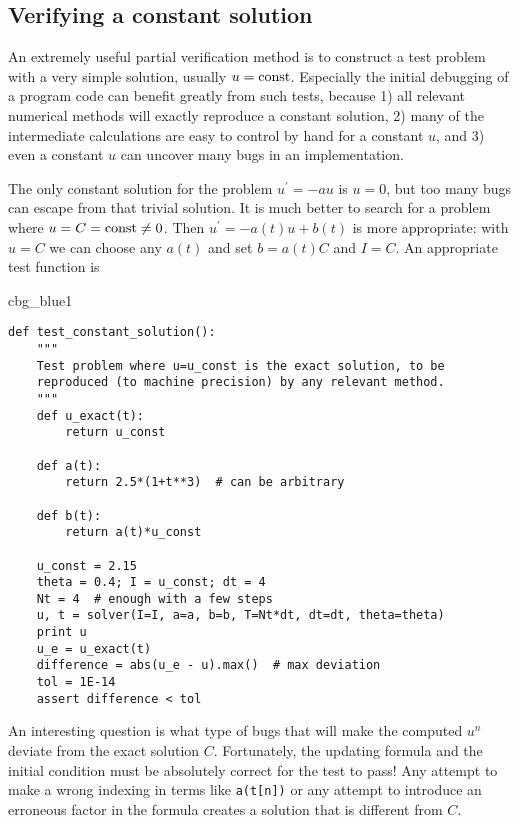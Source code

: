 \documentclass[graybox,sectrefs,envcountresetchap,open=right,final]{svmonodo}
\newenvironment{_cod_tight}[1]{
   \def\FrameCommand{\colorbox{#1}}
   \FrameRule0.6pt\MakeFramed {\FrameRestore}\vskip3mm}
   {\vskip0mm\endMakeFramed}
\newenvironment{cod}[1]{
\bgroup\rmfamily
\fboxsep=0mm\relax
\begin{_cod_tight}{#1}
\list{}{\parsep=-2mm\parskip=0mm\topsep=0pt\leftmargin=2mm
\rightmargin=2\leftmargin\leftmargin=4pt\relax}
\item\relax}
{\endlist\end{_cod_tight}\egroup}
\begin{document}
\subsection{Verifying a constant solution}
\label{decay:verify:trivial}

An extremely useful partial verification method is to construct a test
problem with a very simple solution, usually $u=\hbox{const}$.
Especially the initial debugging of a program code can benefit greatly
from such tests, because 1) all relevant numerical methods will
exactly reproduce a constant solution, 2) many of the intermediate
calculations are easy to control by hand for a constant $u$, and 3) even a
constant $u$ can uncover many bugs in an implementation.

The only constant solution for the problem $u^{\prime}=-au$ is $u=0$, but too
many bugs can escape from that trivial solution.  It is much better to
search for a problem where $u=C=\hbox{const}\neq 0$.  Then $u^{\prime}=-a(t)u
+ b(t)$ is more appropriate: with $u=C$ we can choose any $a(t)$ and
set $b=a(t)C$ and $I=C$. An appropriate test function is

\begin{cod}{cbg_blue1}\begin{Verbatim}[numbers=none,fontsize=\fontsize{9pt}{9pt},baselinestretch=0.95,xleftmargin=2mm]
def test_constant_solution():
    """
    Test problem where u=u_const is the exact solution, to be
    reproduced (to machine precision) by any relevant method.
    """
    def u_exact(t):
        return u_const

    def a(t):
        return 2.5*(1+t**3)  # can be arbitrary

    def b(t):
        return a(t)*u_const

    u_const = 2.15
    theta = 0.4; I = u_const; dt = 4
    Nt = 4  # enough with a few steps
    u, t = solver(I=I, a=a, b=b, T=Nt*dt, dt=dt, theta=theta)
    print u
    u_e = u_exact(t)
    difference = abs(u_e - u).max()  # max deviation
    tol = 1E-14
    assert difference < tol
\end{Verbatim}
\end{cod}
\noindent

An interesting question is what type of bugs that will make the
computed $u^n$ deviate from the exact solution $C$.
Fortunately, the updating formula and the initial condition must
be absolutely correct for the test to pass! Any attempt to make
a wrong indexing in terms like \texttt{a(t[n])} or any attempt to
introduce an erroneous factor in the formula creates a solution
that is different from $C$.
\end{document}
